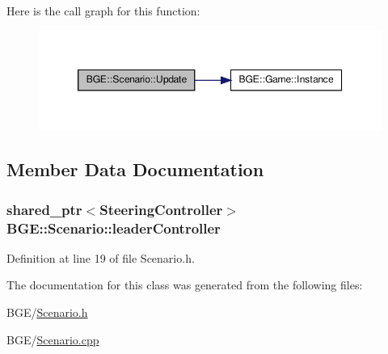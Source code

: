 Here is the call graph for this function\-:
\nopagebreak
\begin{figure}[H]
\begin{center}
\leavevmode
\includegraphics[width=350pt]{class_b_g_e_1_1_scenario_a90fda911795cfa4fce1dae52da954922_cgraph}
\end{center}
\end{figure}




\subsection{Member Data Documentation}
\hypertarget{class_b_g_e_1_1_scenario_a749a0fd4060bccfd020d15925ddbdbe8}{
\subsubsection[{leader\-Controller}]{\setlength{\rightskip}{0pt plus 5cm}shared\-\_\-ptr$<${\bf Steering\-Controller}$>$ B\-G\-E\-::\-Scenario\-::leader\-Controller}}\label{class_b_g_e_1_1_scenario_a749a0fd4060bccfd020d15925ddbdbe8}


Definition at line 19 of file Scenario.\-h.



The documentation for this class was generated from the following files\-:\begin{DoxyCompactItemize}
\item 
B\-G\-E/\hyperlink{_scenario_8h}{Scenario.\-h}\item 
B\-G\-E/\hyperlink{_scenario_8cpp}{Scenario.\-cpp}\end{DoxyCompactItemize}

